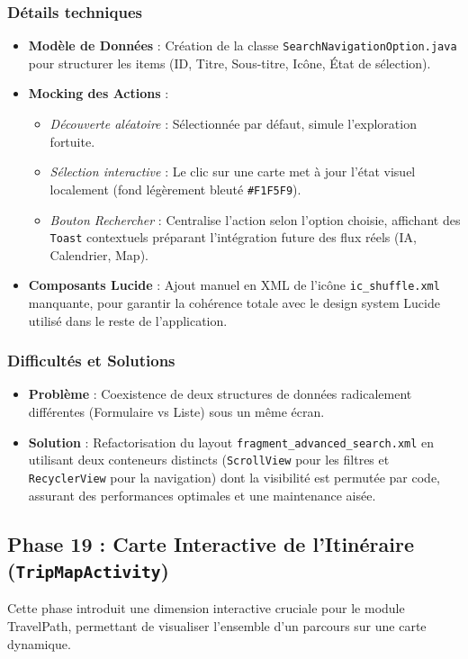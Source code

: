 \documentclass{article}
\begin{document}
\subsubsection{Détails techniques}
\begin{itemize}
    \item \textbf{Modèle de Données} : Création de la classe \texttt{SearchNavigationOption.java} pour structurer les items (ID, Titre, Sous-titre, Icône, État de sélection).
    \item \textbf{Mocking des Actions} :
    \begin{itemize}
        \item \textit{Découverte aléatoire} : Sélectionnée par défaut, simule l'exploration fortuite.
        \item \textit{Sélection interactive} : Le clic sur une carte met à jour l'état visuel localement (fond légèrement bleuté \texttt{\#F1F5F9}).
        \item \textit{Bouton Rechercher} : Centralise l'action selon l'option choisie, affichant des \texttt{Toast} contextuels préparant l'intégration future des flux réels (IA, Calendrier, Map).
    \end{itemize}
    \item \textbf{Composants Lucide} : Ajout manuel en XML de l'icône \texttt{ic\_shuffle.xml} manquante, pour garantir la cohérence totale avec le design system Lucide utilisé dans le reste de l'application.
\end{itemize}

\subsubsection{Difficultés et Solutions}
\begin{itemize}
    \item \textbf{Problème} : Coexistence de deux structures de données radicalement différentes (Formulaire vs Liste) sous un même écran.
    \item \textbf{Solution} : Refactorisation du layout \texttt{fragment\_advanced\_search.xml} en utilisant deux conteneurs distincts (\texttt{ScrollView} pour les filtres et \texttt{RecyclerView} pour la navigation) dont la visibilité est permutée par code, assurant des performances optimales et une maintenance aisée.
\end{itemize}

\subsection{Phase 19 : Carte Interactive de l'Itinéraire (\texttt{TripMapActivity})}
Cette phase introduit une dimension interactive cruciale pour le module TravelPath, permettant de visualiser l'ensemble d'un parcours sur une carte dynamique.
\end{document}
